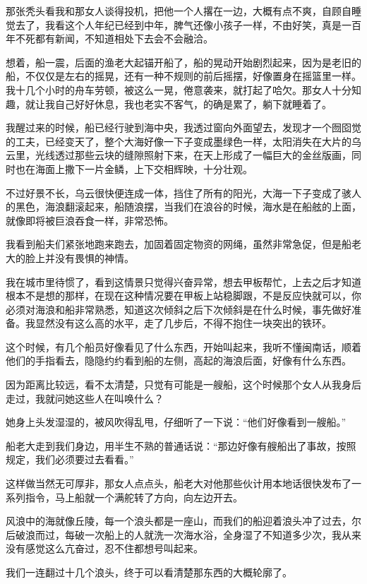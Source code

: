那张秃头看我和那女人谈得投机，把他一个人撂在一边，大概有点不爽，自顾自睡觉去了，我看这个人年纪已经到中年，脾气还像小孩子一样，不由好笑，真是一百年不死都有新闻，不知道相处下去会不会融洽。

想着，船一震，后面的渔老大起锚开船了，船的晃动开始剧烈起来，因为是老旧的船，不仅仅是左右的摇晃，还有一种不规则的前后摇摆，好像置身在摇篮里一样。我十几个小时的舟车劳顿，被这么一晃，倦意袭来，就打起了哈欠。那女人十分知趣，就让我自己好好休息，我也老实不客气，的确是累了，躺下就睡着了。

我醒过来的时候，船已经行驶到海中央，我透过窗向外面望去，发现才一个囫囵觉的工夫，已经变天了，整个大海好像一下子变成墨绿色一样，太阳消失在大片的乌云里，光线透过那些云块的缝隙照射下来，在天上形成了一幅巨大的金丝版画，同时也在海面上撒下一片金鳞，上下交相辉映，十分壮观。

不过好景不长，乌云很快便连成一体，挡住了所有的阳光，大海一下子变成了骇人的黑色，海浪翻滚起来，船随浪摆，当我们在浪谷的时候，海水是在船舷的上面，就像即将被巨浪吞食一样，非常恐怖。

我看到船夫们紧张地跑来跑去，加固着固定物资的网绳，虽然非常急促，但是船老大的脸上并没有畏惧的神情。

我在城市里待惯了，看到这情景只觉得兴奋异常，想去甲板帮忙，上去之后才知道根本不是想的那样，在现在这种情况要在甲板上站稳脚跟，不是反应快就可以，你必须对海浪和船非常熟悉，知道这次倾斜之后下次倾斜是在什么时候，事先做好准备。我显然没有这么高的水平，走了几步后，不得不抱住一块突出的铁环。

这个时候，有几个船员好像看见了什么东西，开始叫起来，我听不懂闽南话，顺着他们的手指看去，隐隐约约看到船的左侧，高起的海浪后面，好像有什么东西。

因为距离比较远，看不太清楚，只觉有可能是一艘船，这个时候那个女人从我身后走过，我就问她这些人在叫唤什么？

她身上头发湿湿的，被风吹得乱甩，仔细听了一下说：“他们好像看到一艘船。”

船老大走到我们身边，用半生不熟的普通话说：“那边好像有艘船出了事故，按照规定，我们必须要过去看看。”

这样做当然无可厚非，那女人点点头，船老大对他那些伙计用本地话很快发布了一系列指令，马上船就一个满舵转了方向，向左边开去。

风浪中的海就像丘陵，每一个浪头都是一座山，而我们的船迎着浪头冲了过去，尔后破浪而过，每破一次船上的人就洗一次海水浴，全身湿了不知道多少次，我从来没有感觉这么亢奋过，忍不住都想号叫起来。

我们一连翻过十几个浪头，终于可以看清楚那东西的大概轮廓了。

